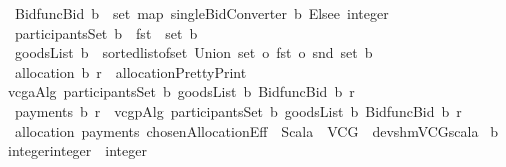 \begin{isabellebody}
\isamarkupfalse%
\ {\isachardoublequoteopen}Bid{}funcBid\ b\ {\isacharequal}\ set\ {\isacharparenleft}map\ singleBidConverter\ b{\isacharparenright}\ Elsee\ {\isacharparenleft}{}{\isacharcolon}{\isacharcolon}integer{\isacharparenright}{\isachardoublequoteclose}\isanewline
\isanewline
{}\isamarkupfalse%
\ {\isachardoublequoteopen}participantsSet\ b\ {\isacharequal}{\isacharequal}\ fst\ {\isacharbackquote}\ {\isacharparenleft}set\ b{\isacharparenright}{\isachardoublequoteclose}\isanewline
{}\isamarkupfalse%
\ {\isachardoublequoteopen}goodsList{}\ b\ {\isacharequal}{\isacharequal}\ sorted{\isacharunderscore}list{\isacharunderscore}of{\isacharunderscore}set\ {\isacharparenleft}Union\ {\isacharparenleft}{\isacharparenleft}set\ o\ fst\ o\ snd{\isacharparenright}\ {\isacharbackquote}{\isacharparenleft}set\ b{\isacharparenright}{\isacharparenright}{\isacharparenright}{\isachardoublequoteclose}\isanewline
\isanewline
{}\isamarkupfalse%
\ {\isachardoublequoteopen}allocation\ b\ r\ {\isacharequal}\ {\isacharbraceleft}allocationPrettyPrint{}\ \isanewline
{\isacharparenleft}vcgaAlg\ {\isacharparenleft}{\isacharparenleft}participantsSet\ b{\isacharparenright}{\isacharparenright}\ {\isacharparenleft}goodsList{}\ b{\isacharparenright}\ {\isacharparenleft}Bid{}funcBid\ b{\isacharparenright}\ r{\isacharparenright}\isanewline
{\isacharbraceright}{\isachardoublequoteclose}\isanewline
\isanewline
{}\isamarkupfalse%
\ {\isachardoublequoteopen}payments\ b\ r\ {\isacharequal}\ vcgpAlg\ {\isacharparenleft}{\isacharparenleft}participantsSet\ b{\isacharparenright}{\isacharparenright}\ {\isacharparenleft}goodsList{}\ b{\isacharparenright}\ {\isacharparenleft}Bid{}funcBid\ b{\isacharparenright}\ r{\isachardoublequoteclose}\isanewline
{}\isamarkupfalse%
\ allocation\ payments\ chosenAllocationEff\ \ Scala\ \ VCG\ \ {\isachardoublequoteopen}{\isacharslash}dev{\isacharslash}shm{\isacharslash}VCG{\isachardot}scala{\isachardoublequoteclose}\isanewline
\isanewline
\isanewline
\isanewline
\isanewline
\isanewline
{}\isamarkupfalse%
\ {\isachardoublequoteopen}b{}{}\ {\isacharequal}{\isacharequal}\ \isanewline
{\isacharbraceleft}\isanewline
{\isacharparenleft}{\isacharparenleft}{}{\isacharcolon}{\isacharcolon}integer{\isacharcomma}{\isacharbraceleft}{}{}{\isacharcolon}{\isacharcolon}integer{\isacharcomma}\ {}{}{\isacharcomma}\ {}{}{\isacharbraceright}{\isacharparenright}{\isacharcomma}{}{}{\isacharcolon}{\isacharcolon}integer{\isacharparenright}{\isacharcomma}\isanewline

\end{isabellebody}
